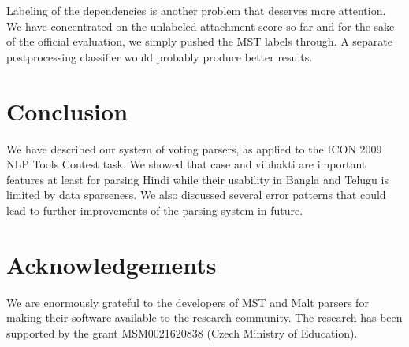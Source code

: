 \documentclass[11pt]{article}
\begin{document}
Labeling of the dependencies is another problem that deserves more attention. We have concentrated on the unlabeled attachment score so far and for the sake of the official evaluation, we simply pushed the MST labels through. A separate postprocessing classifier would probably produce better results.

\section{Conclusion}
\label{sec:concl}

We have described our system of voting parsers, as applied to the ICON 2009 NLP Tools Contest task. We showed that case and vibhakti are important features at least for parsing Hindi while their usability in Bangla and Telugu is limited by data sparseness. We also discussed several error patterns that could lead to further improvements of the parsing system in future.

\section*{Acknowledgements}

We are enormously grateful to the developers of MST and Malt parsers for making their software available to the research community.
The research has been supported by the grant 
MSM0021620838 (Czech Ministry of Education).

\begin{small}

\end{small}
\end{document}
